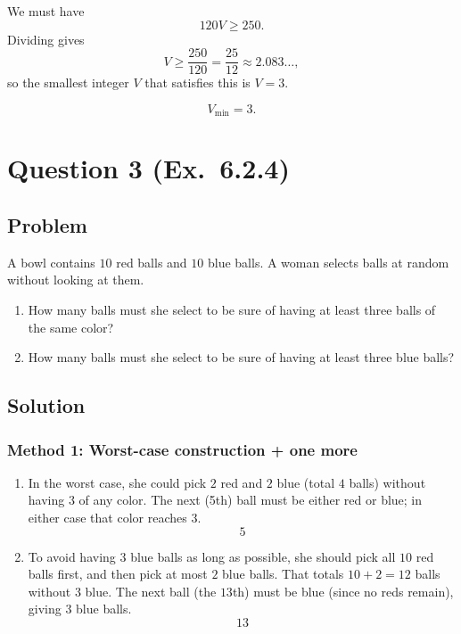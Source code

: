 \documentclass[12pt]{article}
\begin{document}
We must have
\[
120V \ge 250.
\]
Dividing gives
\[
V \ge \frac{250}{120} = \frac{25}{12} \approx 2.083\ldots,
\]
so the smallest integer $V$ that satisfies this is $V=3$.

\[
\boxed{V_{\min}=3.}
\]

\newpage

\section{Question 3 (Ex.\ 6.2.4)}
\subsection{Problem}
A bowl contains $10$ red balls and $10$ blue balls. A woman selects balls at random without looking at them.
\begin{enumerate}[label=(\alph*)]
\item How many balls must she select to be sure of having at least three balls of the same color?
\item How many balls must she select to be sure of having at least three blue balls?
\end{enumerate}

\subsection{Solution}

\subsubsection{Method 1: Worst-case construction + one more}
\begin{enumerate}[label=(\alph*)]
\item In the worst case, she could pick $2$ red and $2$ blue (total $4$ balls) without having $3$ of any color. The next (5th) ball must be either red or blue; in either case that color reaches $3$.
\[
\boxed{5}
\]

\item To avoid having $3$ blue balls as long as possible, she should pick all $10$ red balls first, and then pick at most $2$ blue balls. That totals $10+2=12$ balls without $3$ blue. The next ball (the $13$th) must be blue (since no reds remain), giving $3$ blue balls.
\[
\boxed{13}
\]
\end{enumerate}
\end{document}
